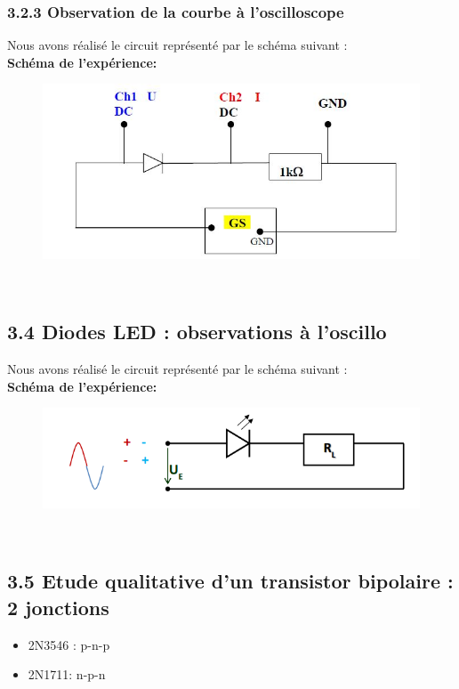 \documentclass{report}
\begin{document}
\subsubsection*{3.2.3 Observation de la courbe à l'oscilloscope}
Nous avons réalisé le circuit représenté par le schéma suivant : \\

\textbf{Schéma de l'expérience: }
\begin{figure}[h!]
\centering
\includegraphics[scale=0.5]{ScheOs.jpg}
\end{figure} \\

\subsection*{3.4 Diodes LED : observations à l'oscillo}
Nous avons réalisé le circuit représenté par le schéma suivant : \\

\textbf{Schéma de l'expérience: }
\begin{figure}[h!]
\centering
\includegraphics[scale=0.5]{led.png}
\end{figure} \\

\subsection*{3.5 Etude qualitative d'un transistor bipolaire : 2 jonctions}

\begin{itemize}
\item 2N3546 : p-n-p
\item 2N1711: n-p-n
\end{itemize}
\newpage
\end{document}
